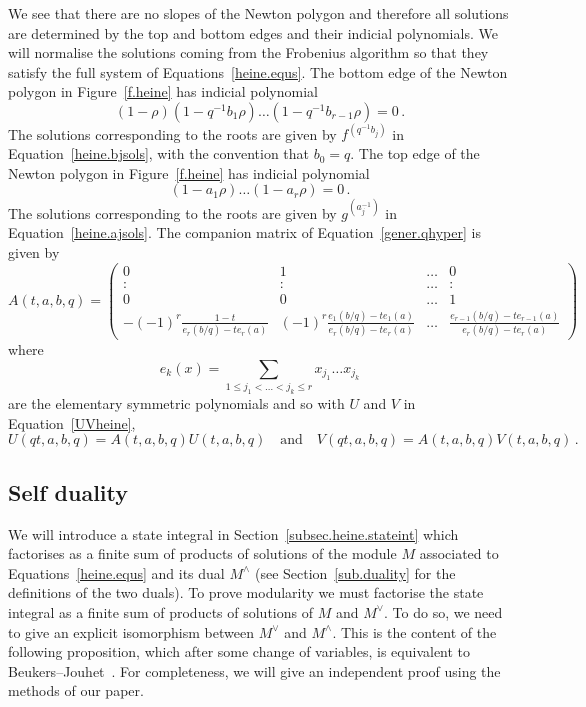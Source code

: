 \documentclass[12pt,reqno]{amsart}
\theoremstyle{definition}
\def\be{\begin{equation}}
\def\ee{\end{equation}}
\begin{document}
We see that there are no slopes of the Newton polygon and therefore all solutions
are determined by the top and bottom edges and their indicial polynomials. We will
normalise the solutions coming from the Frobenius algorithm so that they satisfy
the full system of Equations~\eqref{heine.equs}. The bottom edge of the Newton
polygon in Figure~\ref{f.heine} has indicial polynomial
\be
  (1-\rho)(1-q^{-1}b_{1}\rho)\dots(1-q^{-1}b_{r-1}\rho)=0\,.
\ee
The solutions corresponding to the roots are given by $f^{(q^{-1}b_{j})}$ in
Equation~\eqref{heine.bjsols}, with the convention that $b_0=q$. The top
edge of the Newton polygon in Figure~\ref{f.heine} has indicial polynomial
\be
  (1-a_{1}\rho)\dots(1-a_{r}\rho)=0\,.
\ee
The solutions corresponding to the roots are given by $g^{(a_{j}^{-1})}$ in
Equation~\eqref{heine.ajsols}. The companion matrix of Equation~\eqref{gener.qhyper}
is given by
\be
  A(t,a,b,q)
  =
  \begin{pmatrix}
    0 & 1  & \dots & 0\\
    : & : & \dots & :\\
    0 & 0 & \dots & 1\\
    -(-1)^{r}\frac{1-t}{e_{r}(b/q)-te_{r}(a)}
    & (-1)^{r}\frac{e_{1}(b/q)-te_{1}(a)}{e_{r}(b/q)-te_{r}(a)} & \dots
    & \frac{e_{r-1}(b/q)-te_{r-1}(a)}{e_{r}(b/q)-te_{r}(a)}
  \end{pmatrix}
\ee
where
\be
  e_{k}(x)
  =
  \sum_{1\leq j_{1}<\dots<j_{k}\leq r}x_{j_{1}}\dots x_{j_{k}}
  \ee are the elementary symmetric polynomials and so with $U$ and $V$ in
  Equation~\eqref{UVheine},
\be
  U(qt,a,b,q)
  =
  A(t,a,b,q)U(t,a,b,q)
  \quad\text{and}\quad
  V(qt,a,b,q)
  =
  A(t,a,b,q)V(t,a,b,q)\,.
\ee

\subsection{Self duality}

We will introduce a state integral in Section~\ref{subsec.heine.stateint} which
factorises as a finite sum of products of solutions of the module $M$ associated
to Equations~\eqref{heine.equs} and its dual $M^{\wedge}$ (see Section~\ref{sub.duality}
for the definitions of the two duals). To prove modularity we must factorise the state
integral as a finite sum of products of solutions of $M$ and $M^{\vee}$. To do
so, we need to give an explicit isomorphism between $M^{\vee}$ and $M^{\wedge}$.
This is the content of the following proposition, which after some change of
variables, is equivalent to Beukers--Jouhet~\cite[Thm.1.3]{Beukers:duality}.
For completeness, we will give an independent proof using the methods of our paper.
\end{document}
